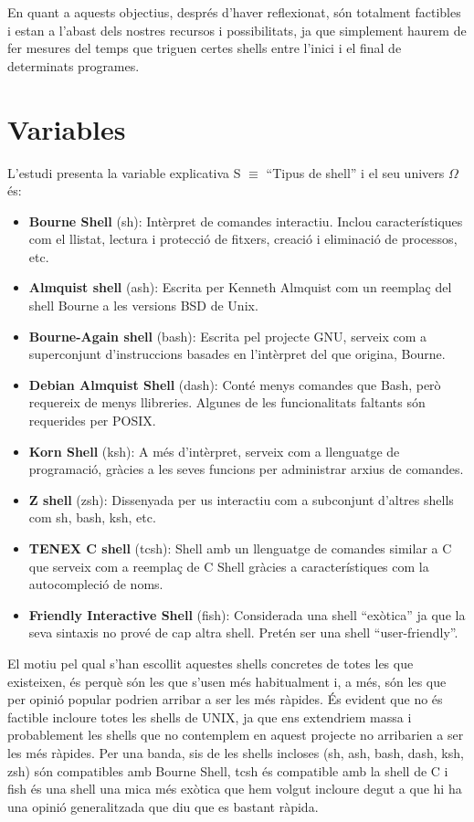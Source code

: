 \documentclass[12pt]{article}
\begin{document}
En quant a aquests objectius, després d'haver reflexionat, són totalment factibles i estan a l'abast
dels nostres recursos i possibilitats, ja que simplement haurem de fer mesures del temps que triguen
certes shells entre l'inici i el final de determinats programes.
\newpage

\section{Variables}
L'estudi presenta la variable explicativa S $\equiv$ ``Tipus de shell'' i el seu univers $\Omega$ és:
\begin{itemize}
  \item \textbf{Bourne Shell} (sh): Intèrpret de comandes interactiu. Inclou característiques com 
    el llistat, lectura i protecció de fitxers, creació i eliminació de processos, etc.
  \item \textbf{Almquist shell} (ash): Escrita per Kenneth Almquist com un reemplaç del shell Bourne 
    a les versions BSD de Unix.
  \item \textbf{Bourne-Again shell} (bash): Escrita pel projecte GNU, serveix com a superconjunt 
    d’instruccions basades en l’intèrpret del que origina, Bourne.
  \item \textbf{Debian Almquist Shell} (dash): Conté menys comandes que Bash, però requereix de 
    menys llibreries. Algunes de les funcionalitats faltants són requerides per POSIX. 
  \item \textbf{Korn Shell} (ksh): A més d’intèrpret, serveix com a llenguatge de programació, 
    gràcies a les seves funcions per administrar arxius de comandes. 
  \item \textbf{Z shell} (zsh): Dissenyada per us interactiu com a subconjunt d’altres shells com 
    sh, bash, ksh, etc.
  \item \textbf{TENEX C shell} (tcsh): Shell amb un llenguatge de comandes similar a C que serveix 
    com a reemplaç de C Shell gràcies a característiques com la autocompleció de noms.
  \item \textbf{Friendly Interactive Shell} (fish): Considerada una shell “exòtica” ja que la 
    seva sintaxis no prové de cap altra shell. Pretén ser una shell “user-friendly”.
\end{itemize}
El motiu pel qual s'han escollit aquestes shells concretes de totes les que existeixen, és perquè són
les que s'usen més habitualment i, a més, són les que per opinió popular podrien arribar a ser les més 
ràpides. És evident que no és factible incloure totes les shells de UNIX, ja que ens extendriem massa
i probablement les shells que no contemplem en aquest projecte no arribarien a ser les més ràpides. Per
una banda, sis de les shells incloses (sh, ash, bash, dash, ksh, zsh) són compatibles amb Bourne Shell,
tcsh és compatible amb la shell de C i fish és una shell una mica més exòtica que hem volgut incloure
degut a que hi ha una opinió generalitzada que diu que es bastant ràpida.\\
\end{document}
